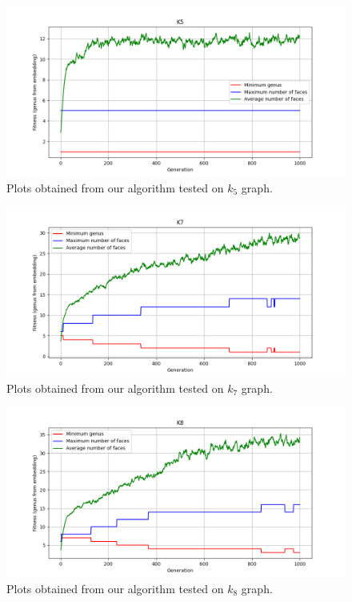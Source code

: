 \documentclass{article}
\begin{document}
\begin{figure}[!tbh]
    \centering
    \label{tests3}
    \includegraphics[scale = 0.5]{k5.png}
    \caption{Plots obtained from our algorithm tested on $k_5$ graph.}
\end{figure}
\begin{figure}[!tbh]
    \centering
    \label{tests4}
    \includegraphics[scale = 0.5]{k7.png}
    \caption{Plots obtained from our algorithm tested on $k_7$ graph.}
\end{figure}
\begin{figure}[!tbh]
    \centering
    \label{tests5}
    \includegraphics[scale = 0.5]{k8.png}
    \caption{Plots obtained from our algorithm tested on $k_8$ graph.}
\end{figure}
\end{document}
